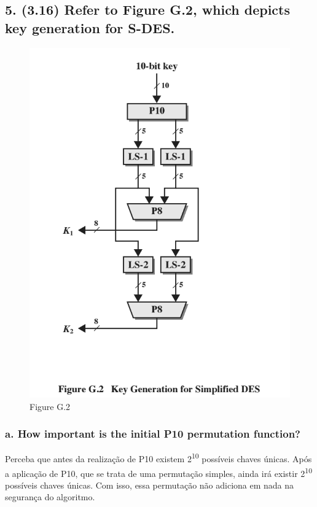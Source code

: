 \documentclass[12pt]{article}
\begin{document}
\subsection*{5. (3.16) Refer to Figure G.2, which depicts key generation for
S-DES.}

  \begin{figure}[h]
    \includegraphics[width=\linewidth]{s_des_key_generation}
    \caption{Figure G.2}
  \end{figure}

  \subsubsection*{a. How important is the initial P10 permutation function?}

    Perceba que antes da realização de P10 existem 2\textsuperscript{10}
    possíveis chaves únicas. Após a aplicação de P10, que se trata de uma
    permutação simples, ainda irá existir 2\textsuperscript{10} possíveis chaves
    únicas. Com isso, essa permutação não adiciona em nada na segurança do
    algoritmo.
\end{document}
